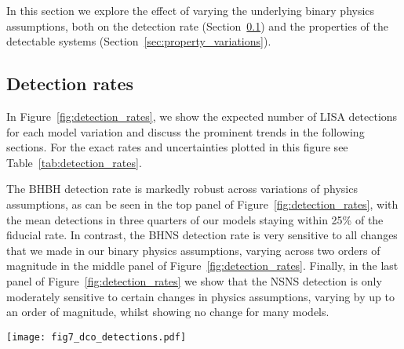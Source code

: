 In this section we explore the effect of varying the underlying binary physics assumptions, both on the detection rate (Section~\ref{sec:detection_rate_analysis}) and the properties of the detectable systems (Section~\ref{sec:property_variations}).

\subsection{Detection rates}\label{sec:detection_rate_analysis}
In Figure~\ref{fig:detection_rates}, we show the expected number of LISA detections for each model variation and discuss the prominent trends in the following sections. For the exact rates and uncertainties plotted in this figure see Table~\ref{tab:detection_rates}.

The BHBH detection rate is markedly robust across variations of physics assumptions, as can be seen in the top panel of Figure~\ref{fig:detection_rates}, with the mean detections in three quarters of our models staying within 25\% of the fiducial rate. In contrast, the BHNS detection rate is very sensitive to all changes that we made in our binary physics assumptions, varying across two orders of magnitude in the middle panel of Figure~\ref{fig:detection_rates}. Finally, in the last panel of Figure~\ref{fig:detection_rates} we show that the NSNS detection is only moderately sensitive to certain changes in physics assumptions, varying by up to an order of magnitude, whilst showing no change for many models.

\begin{figure*}[p]
    \centering
    \texttt{[image: fig7\_dco\_detections.pdf]}
    \caption{The number of expected detections in the LISA mission for different DCO types and model variations. Error bars show the 1- (solid) and 2-$\sigma$ (dotted) Poisson uncertainties. An arrow indicates that the error bar extends to zero. The left axis and grid lines show the number of detections in a 4-year LISA mission and the right axis shows an approximation of the number of detections in a 10-year mission (we scale the axis by $\sqrt{T_{\rm obs}}$, see Table~\ref{tab:detection_rates} for exact rates). Each model is described in further detail in Table~\ref{tab:physics_variations} and details of the fiducial assumptions are in Section~\ref{app:fiducial_physics}. See also Fig.~\ref{fig:dco_relative_rates} and Sec.~\ref{sec:detection_rate_analysis} for a discussion. \href{https://github.com/TomWagg/detecting-DCOs-in-LISA/blob/main/paper/figures/fig7_dco_detections.png}{\faFileImage} \href{https://github.com/TomWagg/detecting-DCOs-in-LISA/blob/main/paper/figure_notebooks/variations.ipynb}{\faBook}. }
    \label{fig:detection_rates}
\end{figure*}

